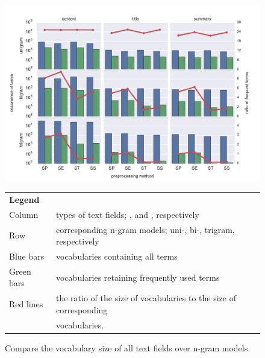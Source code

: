 \begin{figure}[!htb]
    \centering
    \includegraphics[width=\textwidth]{fig/vocab_size}
    \caption{Compare the vocabulary size of all text fields over n-gram models.}
    \begin{tabular}{|ll|} \hline \textbf{Legend} & \\ Column & types of text fields; \icontent{}, \ititle{} and \isummary{}, respectively \\ Row & corresponding n-gram models; uni-, bi-, trigram, respectively \\ Blue bars & \ifull{} vocabularies containing all terms \\ Green bars & \icommon{} vocabularies retaining frequently used terms \\ Red lines & the ratio of the size of \icommon{} vocabularies to the size of corresponding \\ & \ifull{} vocabularies. \\ \hline \end{tabular}
    \label{fig:vocab_size}
\end{figure}


